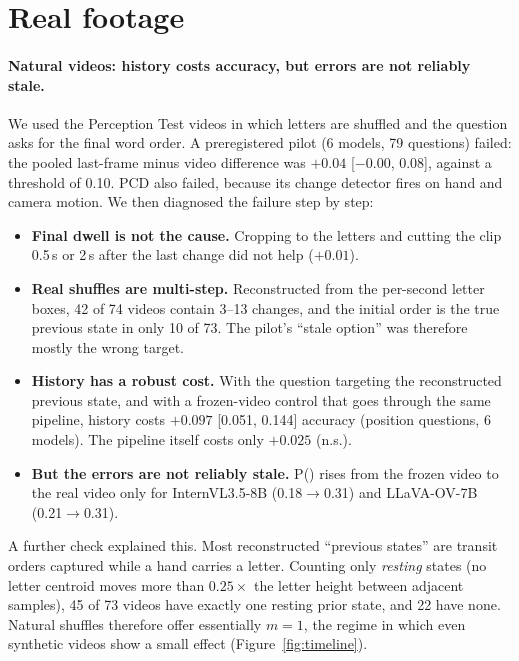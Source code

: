 \documentclass[10pt,twocolumn,letterpaper]{article}
\newcommand{\pstale}{P(\text{stale})}
\begin{document}
\section{Real footage}
\label{sec:real}

\paragraph{Natural videos: history costs accuracy, but errors are not reliably stale.} We used the Perception Test videos in which letters are shuffled and the question asks for the final word order. A preregistered pilot (6 models, 79 questions) failed: the pooled last-frame minus video difference was $+0.04$ [$-0.00$, 0.08], against a threshold of 0.10. PCD also failed, because its change detector fires on hand and camera motion. We then diagnosed the failure step by step:
\begin{itemize}
  \item \textbf{Final dwell is not the cause.} Cropping to the letters and cutting the clip 0.5\,s or 2\,s after the last change did not help ($+0.01$).
  \item \textbf{Real shuffles are multi-step.} Reconstructed from the per-second letter boxes, 42 of 74 videos contain 3--13 changes, and the initial order is the true previous state in only 10 of 73. The pilot's ``stale option'' was therefore mostly the wrong target.
  \item \textbf{History has a robust cost.} With the question targeting the reconstructed previous state, and with a frozen-video control that goes through the same pipeline, history costs $+0.097$ [0.051, 0.144] accuracy (position questions, 6 models). The pipeline itself costs only $+0.025$ (n.s.).
  \item \textbf{But the errors are not reliably stale.} \pstale{} rises from the frozen video to the real video only for InternVL3.5-8B (0.18$\to$0.31) and LLaVA-OV-7B (0.21$\to$0.31).
\end{itemize}
A further check explained this. Most reconstructed ``previous states'' are transit orders captured while a hand carries a letter. Counting only \emph{resting} states (no letter centroid moves more than $0.25\times$ the letter height between adjacent samples), 45 of 73 videos have exactly one resting prior state, and 22 have none. Natural shuffles therefore offer essentially $m=1$, the regime in which even synthetic videos show a small effect (Figure~\ref{fig:timeline}).
\end{document}
